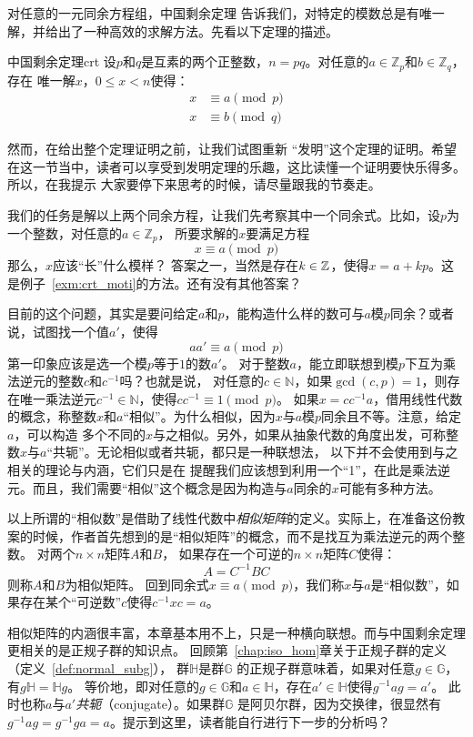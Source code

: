 对任意的一元同余方程组，中国剩余定理
告诉我们，对特定的模数总是有唯一解，并给出了一种高效的求解方法。先看以下定理的描述。

\begin{theorem}{中国剩余定理}{crt}
设$p$和$q$是互素的两个正整数，$n = pq$。对任意的$a \in \mathbb{Z}_p$和$b \in \mathbb{Z}_q$，存在
唯一解$x$，$0 \leq x < n$使得：
\begin{align*}
x &\equiv a \pmod{p}\\
x &\equiv b \pmod{q}
\end{align*}
\end{theorem}

然而，在给出整个定理证明之前，让我们试图重新
“发明”这个定理的证明。希望在这一节当中，读者可以享受到发明定理的乐趣，这比读懂一个证明要快乐得多。所以，在我提示
大家要停下来思考的时候，请尽量跟我的节奏走。

我们的任务是解以上两个同余方程，让我们先考察其中一个同余式。比如，设$p$为一个整数，对任意的$a \in \mathbb{Z}_p$，
所要求解的$x$要满足方程
\[x \equiv a \pmod{p}\]
那么，$x$应该“长”什么模样？
答案之一，当然是存在$k\in {\mathbb Z}$，使得$x = a +kp$。这是例子~\ref{exm:crt_moti}的方法。还有没有其他答案？

目前的这个问题，其实是要问给定$a$和$p$，能构造什么样的数可与$a$模$p$同余？或者说，试图找一个值$a'$，使得
\[ a a' \equiv a \pmod{p}\]
第一印象应该是选一个模$p$等于$1$的数$a'$。
对于整数$a$，能立即联想到模$p$下互为乘法逆元的整数$c$和$c^{-1}$吗？也就是说，
对任意的$c\in \mathbb{N}$，如果$\gcd(c,p)=1$，则存在唯一乘法逆元$c^{-1}\in \mathbb{N}$，使得$c c^{-1} \equiv 1 \pmod{p}$。
如果$x = c c^{-1} a$，借用线性代数的概念，称整数$x$和$a$“相似”。为什么相似，因为$x$与$a$模$p$同余且不等。注意，给定$a$，可以构造
多个不同的$x$与之相似。另外，如果从抽象代数的角度出发，可称整数$x$与$a$“共轭”。无论相似或者共轭，都只是一种联想法，
以下并不会使用到与之相关的理论与内涵，它们只是在
提醒我们应该想到利用一个“1”，在此是乘法逆元。而且，我们需要“相似”这个概念是因为构造与$a$同余的$x$可能有多种方法。

以上所谓的“相似数”是借助了线性代数中\emph{相似矩阵}的定义。实际上，在准备这份教案的时候，作者首先想到的是“相似矩阵”的概念，而不是找互为乘法逆元的两个整数。
对两个$n\times n$矩阵$A$和$B$，
如果存在一个可逆的$n\times n$矩阵$C$使得：
\[A = C^{-1}BC\]
则称$A$和$B$为相似矩阵。
回到同余式$x \equiv a \pmod{p}$，我们称$x$与$a$是“相似数”，如果存在某个“可逆数”$c$使得$c^{-1}x c = a$。

相似矩阵的内涵很丰富，本章基本用不上，只是一种横向联想。而与中国剩余定理更相关的是正规子群的知识点。
回顾第~\ref{chap:iso_hom}章关于正规子群的定义（定义~\ref{def:normal_subg}），
群$\mathbb{H}$是群$\mathbb{G}$ 的正规子群意味着，如果对任意$g \in \mathbb{G}$，有$g\mathbb{H} = \mathbb{H}g$。
等价地，即对任意的$g \in \mathbb{G}$和$a \in \mathbb{H}$，存在$a' \in \mathbb{H}$使得$g^{-1} a g = a'$。
此时也称$a$与$a'$\emph{共轭}（conjugate）。如果群$\mathbb{G}$
是阿贝尔群，因为交换律，很显然有$g^{-1} a g = g^{-1} g a = a$。提示到这里，读者能自行进行下一步的分析吗？

